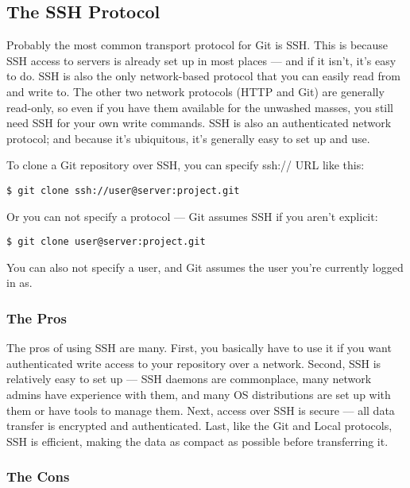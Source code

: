 \documentclass[a4paper]{book}
\begin{document}
\subsection{The SSH Protocol}

Probably the most common transport protocol for Git is SSH. This is because SSH access to servers is already set up in most places --- and if it isn't, it's easy to do. SSH is also the only network-based protocol that you can easily read from and write to. The other two network protocols (HTTP and Git) are generally read-only, so even if you have them available for the unwashed masses, you still need SSH for your own write commands. SSH is also an authenticated network protocol; and because it's ubiquitous, it's generally easy to set up and use.

To clone a Git repository over SSH, you can specify ssh:// URL like this:

\begin{shaded}\begin{verbatim}
$ git clone ssh://user@server:project.git
\end{verbatim}\end{shaded}

Or you can not specify a protocol --- Git assumes SSH if you aren't explicit:

\begin{shaded}\begin{verbatim}
$ git clone user@server:project.git
\end{verbatim}\end{shaded}

You can also not specify a user, and Git assumes the user you're currently logged in as.

\subsubsection{The Pros}

The pros of using SSH are many. First, you basically have to use it if you want authenticated write access to your repository over a network. Second, SSH is relatively easy to set up --- SSH daemons are commonplace, many network admins have experience with them, and many OS distributions are set up with them or have tools to manage them. Next, access over SSH is secure --- all data transfer is encrypted and authenticated. Last, like the Git and Local protocols, SSH is efficient, making the data as compact as possible before transferring it.

\subsubsection{The Cons}
\end{document}

